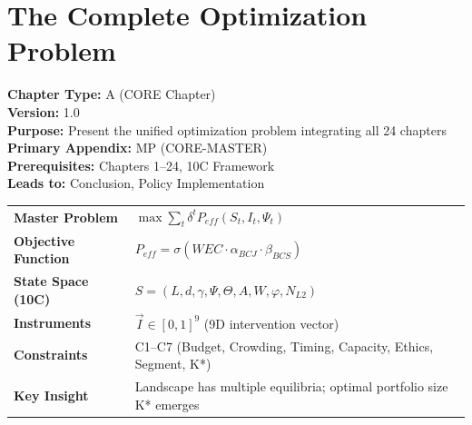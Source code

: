 
\chapter{The Complete Optimization Problem}
\label{ch:complete-optimization}

\begin{tcolorbox}[colback=gray!5!white,colframe=gray!75!black]
\small
\textbf{Chapter Type:} A (CORE Chapter) \\
\textbf{Version:} 1.0 \\
\textbf{Purpose:} Present the unified optimization problem integrating all 24 chapters \\
\textbf{Primary Appendix:} MP (CORE-MASTER) \\
\textbf{Prerequisites:} Chapters 1--24, 10C Framework \\
\textbf{Leads to:} Conclusion, Policy Implementation
\end{tcolorbox}

\begin{tcolorbox}[colback=blue!5!white,colframe=blue!75!black,
    title=\textbf{Quick Reference: Key Concepts in This Chapter}]
\small
\begin{tabular}{@{}p{3.5cm}p{9cm}@{}}
\textbf{Master Problem} & $\max \sum_t \delta^t P_{eff}(S_t, I_t, \Psi_t)$ \\[3pt]
\textbf{Objective Function} & $P_{eff} = \sigma(WEC \cdot \alpha_{BCJ} \cdot \beta_{BCS})$ \\[3pt]
\textbf{State Space (10C)} & $S = (L, d, \gamma, \Psi, \Theta, A, W, \varphi, N_{L2})$ \\[3pt]
\textbf{Instruments} & $\vec{I} \in [0,1]^9$ (9D intervention vector) \\[3pt]
\textbf{Constraints} & C1--C7 (Budget, Crowding, Timing, Capacity, Ethics, Segment, K*) \\[3pt]
\textbf{Key Insight} & Landscape has multiple equilibria; optimal portfolio size K* emerges \\
\end{tabular}
\end{tcolorbox}

